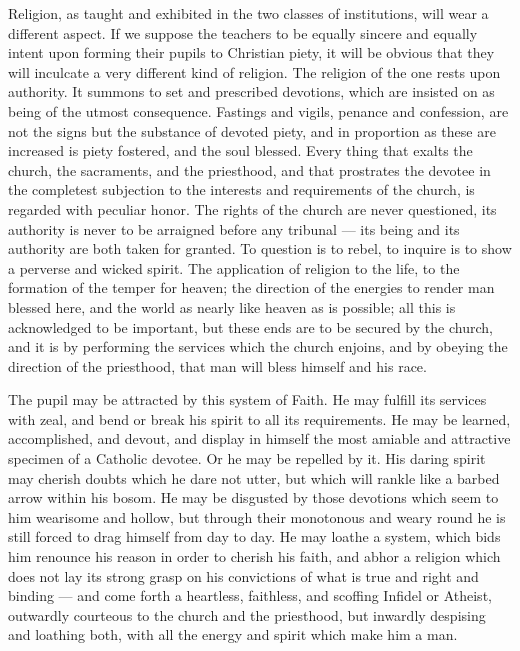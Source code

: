 \documentclass[]{book}
\begin{document}
Religion, as taught and exhibited in the two classes of institutions, will wear a different aspect. If we suppose the teachers to be equally sincere and equally intent upon forming their pupils to Christian piety, it will be obvious that they will inculcate a very different kind of religion. The religion of the one rests upon authority. It summons to set and prescribed devotions, which are insisted on as being of the utmost consequence. Fastings and vigils, penance and confession, are not the signs but the substance of devoted piety, and in proportion as these are increased is piety fostered, and the soul blessed. Every thing that exalts the church, the sacraments, and the priesthood, and that prostrates the devotee in the completest subjection to the interests and requirements of the church, is regarded with peculiar honor. The rights of the church are never questioned, its authority is never to be arraigned before any tribunal --- its being and its authority are both taken for granted. To question is to rebel, to inquire is to show a perverse and wicked spirit. The application of religion to the life, to the formation of the temper for heaven; the direction of the energies to render man blessed here, and the world as nearly like heaven as is possible; all this is acknowledged to be important, but these ends are to be secured by the church, and it is by performing the services which the church enjoins, and by obeying the direction of the priesthood, that man will bless himself and his race.

The pupil may be attracted by this system of Faith. He may fulfill its services with zeal, and bend or break his spirit to all its requirements. He may be learned, accomplished, and devout, and display in himself the most amiable and attractive specimen of a Catholic devotee. Or he may be repelled by it. His daring spirit may cherish doubts which he dare not utter, but which will rankle like a barbed arrow within his bosom. He may be disgusted by those devotions which seem to him wearisome and hollow, but through their monotonous and weary round he is still forced to drag himself from day to day. He may loathe a system, which bids him renounce his reason in order to cherish his faith, and abhor a religion which does not lay its strong grasp on his convictions of what is true and right and binding --- and come forth a heartless, faithless, and scoffing Infidel or Atheist, outwardly courteous to the church and the priesthood, but inwardly despising and loathing both, with all the energy and spirit which make him a man.
\end{document}

